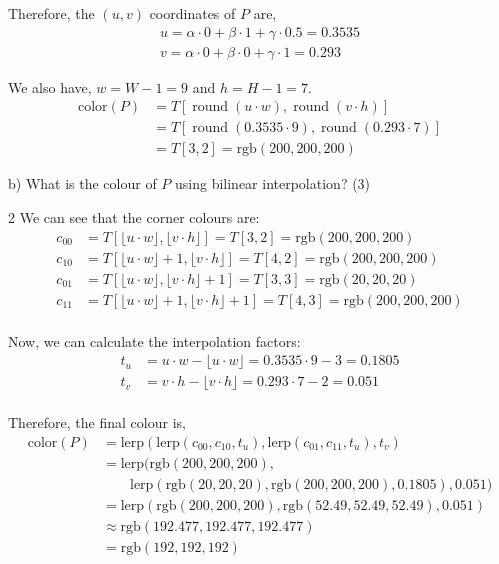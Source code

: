 \documentclass[11pt,answers]{exam}
\begin{document}
\begin{questions}
{Therefore, the $(u, v)$ coordinates of $P$ are,
\begin{align*}
  u = \alpha \cdot 0 + \beta \cdot 1 + \gamma \cdot 0.5 = 0.3535 \\
  v = \alpha \cdot 0 + \beta \cdot 0 + \gamma \cdot 1 = 0.293
\end{align*}

We also have, $w = W - 1 = 9$ and $h = H - 1 = 7$.
\begin{align*}
  \text{color}(P) &= T\left[ \operatorname{round}(u \cdot w), \operatorname{round}(v \cdot h) \right] \\
  &= T\left[ \operatorname{round}(0.3535 \cdot 9), \operatorname{round}(0.293 \cdot 7) \right] \\
  &= T[3, 2] = \text{rgb}(200, 200, 200)
\end{align*}

b) What is the colour of $P$ using bilinear interpolation?  \hfill (3)
{
\footnotesize
\begin{multicols}{2}
  We can see that the corner colours are:
  \begin{align*}
    c_{00} &= T\left[ \lfloor u \cdot w \rfloor, \lfloor v \cdot h \rfloor \right] = T[3, 2] = \text{rgb}(200, 200, 200) \\
    c_{10} &= T\left[ \lfloor u \cdot w \rfloor + 1, \lfloor v \cdot h \rfloor \right] = T[4, 2] = \text{rgb}(200, 200, 200) \\
    c_{01} &= T\left[ \lfloor u \cdot w \rfloor, \lfloor v \cdot h \rfloor + 1 \right] = T[3, 3] = \text{rgb}(20, 20, 20) \\
    c_{11} &= T\left[ \lfloor u \cdot w \rfloor + 1, \lfloor v \cdot h \rfloor + 1 \right] = T[4, 3] = \text{rgb}(200, 200, 200) \\
  \end{align*}

  Now, we can calculate the interpolation factors:
  \begin{align*}
    t_u &= u \cdot w - \lfloor u \cdot w \rfloor = 0.3535 \cdot 9 - 3 = 0.1805 \\
    t_v &= v \cdot h - \lfloor v \cdot h \rfloor = 0.293 \cdot 7 - 2 = 0.051 \\
  \end{align*}

  Therefore, the final colour is,
  \begin{align*}
    \text{color}(P) &= \text{lerp}(\text{lerp}(c_{00}, c_{10}, t_u), \text{lerp}(c_{01}, c_{11}, t_u), t_v) \\
    &= \text{lerp}(\text{rgb}(200, 200, 200), \\
    & \quad \quad \text{lerp}(\text{rgb}(20, 20, 20), \text{rgb}(200, 200, 200), 0.1805), 0.051) \\
    &= \text{lerp}(\text{rgb}(200, 200, 200), \text{rgb}(52.49,52.49,52.49), 0.051) \\
    &\approx \text{rgb}(192.477, 192.477, 192.477) \\
    &= \text{rgb}(192, 192, 192)
  \end{align*}


\end{multicols}}}
\end{questions}
\end{document}
